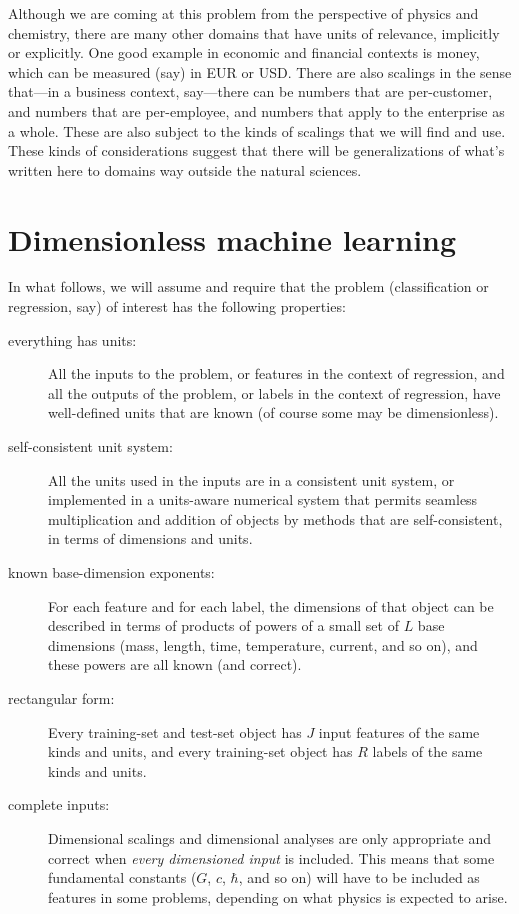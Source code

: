 \documentclass{article}
\begin{document}
Although we are coming at this problem from the perspective of physics and chemistry, there are many other domains that have units of relevance, implicitly or explicitly.
One good example in economic and financial contexts is money, which can be measured (say) in EUR or USD.
There are also scalings in the sense that---in a business context, say---there can be numbers that are per-customer, and numbers that are per-employee, and numbers that apply to the enterprise as a whole.
These are also subject to the kinds of scalings that we will find and use.
These kinds of considerations suggest that there will be generalizations of what's written here to domains way outside the natural sciences.

\section{Dimensionless machine learning}

In what follows, we will assume and require that the problem (classification or regression, say) of interest has the following properties:
\begin{description}
    \item[everything has units:] All the inputs to the problem, or features in the context of regression, and all the outputs of the problem, or labels in the context of regression, have well-defined units that are known (of course some may be dimensionless).
    \item[self-consistent unit system:] All the units used in the inputs are in a consistent unit system, or implemented in a units-aware numerical system that permits seamless multiplication and addition of objects by methods that are self-consistent, in terms of dimensions and units.
    \item[known base-dimension exponents:] For each feature and for each label, the dimensions of that object can be described in terms of products of powers of a small set of $L$ base dimensions (mass, length, time, temperature, current, and so on), and these powers are all known (and correct).
    \item[rectangular form:] Every training-set and test-set object has $J$ input features of the same kinds and units, and every training-set object has $R$ labels of the same kinds and units.
    \item[complete inputs:] Dimensional scalings and dimensional analyses are only appropriate and correct when \emph{every dimensioned input} is included. This means that some fundamental constants ($G$, $c$, $\hbar$, and so on) will have to be included as features in some problems, depending on what physics is expected to arise.
\end{description}
\end{document}
